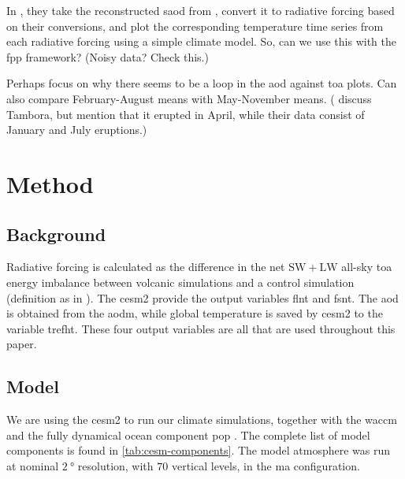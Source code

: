 \documentclass[twocol]{ametsocV5}
\begin{document}
In \citet{marshall2020}, they take the reconstructed \acrshort{saod} from
\citet{toohey2017}, convert it to radiative forcing based on their conversions, and plot
the corresponding temperature time series from each radiative forcing using a simple
climate model. So, can we use this with the \acrfull{fpp} framework?
(Noisy data? Check this.)

Perhaps focus on why there seems to be a loop in the \acrshort{aod} against
\acrshort{toa} plots. Can also compare February-August means with May-November means.
(\citet{marshall2021} discuss Tambora, but mention that it erupted in April, while their
data consist of January and July eruptions.)


\section{Method}

\subsection{Background}

Radiative forcing is calculated as the difference in the net \( \mathrm{SW} +
\mathrm{LW} \) all-sky \acrshort{toa} energy imbalance between volcanic simulations and
a control simulation (definition as in \citet{marshall2020}). The \acrshort{cesm2}
provide the output variables \acrfull{flnt} and \acrfull{fsnt}. The \acrshort{aod} is
obtained from the \acrfull{aodm}, while global temperature is saved by \acrshort{cesm2}
to the variable \acrfull{trefht}. These four output variables are all that are used
throughout this paper.

\subsection{Model}

We are using the \acrfull{cesm2} \citep{danabasoglu2020} to run our climate simulations,
together with the \acrfull{waccm} \citep{gettleman2019} and the fully dynamical ocean
component \acrfull{pop} \citep{smith2010, danabasoglu2020}. The complete list of model
components is found in \cref{tab:cesm-components}. The model atmosphere was run at
nominal \(\SI{2}{\degree}\) resolution, with \(70\) vertical levels, in the \acrfull{ma}
configuration.
\end{document}
